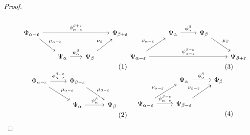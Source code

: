 \begin{proof}
  \begin{subequations}
  \begin{minipage}{0.45\textwidth}
  \begin{equation}\label{dgm:intr1}\begin{tikzcd}[column sep=scriptsize]
    \Phi_{\alpha-\e}  \arrow[to=Fb, "\phi_{\alpha-\e}^{\beta+\e}"]
                      \arrow[to=Ga, "\mu_{\alpha-\e}"]
    & & & |[alias=Fb]|
      \Phi_{\beta+\e} \\
    & |[alias=Ga]|
    \Psi_\alpha \arrow[to=Gb, "\psi_\alpha^\beta"]
    & |[alias=Gb]|
      \Psi_\beta \arrow[to=Fb, "\nu_\beta"] &
  \end{tikzcd}\end{equation}
  \begin{equation}\label{dgm:intr3}\begin{tikzcd}
    \Phi_{\alpha-\e}  \arrow[to=Fb, "\phi_{\alpha-\e}^{\beta-\e}"]
                      \arrow[to=Ga, "\mu_{\alpha-\e}"]
    & |[alias=Fb]|
      \Phi_{\beta-\e} \arrow[to=Gb, "\mu_{\beta -\e}"] \\
    & |[alias=Ga]|
    \Psi_\alpha \arrow[to=Gb, "\psi_\alpha^\beta"]
    & |[alias=Gb]|
      \Psi_\beta
  \end{tikzcd}\end{equation}
  \end{minipage} \begin{minipage}{0.45\textwidth}
  \begin{equation}\label{dgm:intr2}\begin{tikzcd}
    & |[alias=Fa]|
    \Phi_\alpha  \arrow[to=Fb, "\phi_\alpha^\beta"]
    & |[alias=Fb]|
      \Phi_\beta  \arrow[to=Gb, "\mu_\beta"] & \\
    \Psi_{\alpha-\e}  \arrow[to=Gb, "\psi_{\alpha-\e}^{\beta+\e}"]
                      \arrow[to=Fa, "\nu_{\alpha-\e}"]
    & & & |[alias=Gb]|
      \Psi_{\beta + \e}
  \end{tikzcd}\end{equation}
  \begin{equation}\label{dgm:intr4}\begin{tikzcd}
    & |[alias=Fa]|
    \Phi_\alpha  \arrow[to=Fb, "\phi_\alpha^\beta"]
    & |[alias=Fb]|
      \Phi_\beta\\
    \Psi_{\alpha-\e}  \arrow[to=Gb, "\psi_{\alpha-\e}^{\beta-\e}"]
                      \arrow[to=Fa, "\nu_{\alpha-\e}"]
    & |[alias=Gb]|
      \Psi_{\beta - \e} \arrow[to=Fb, "\nu_{\beta-\e}"]&
  \end{tikzcd}\end{equation}
  \end{minipage}
  \end{subequations}


\end{proof}
